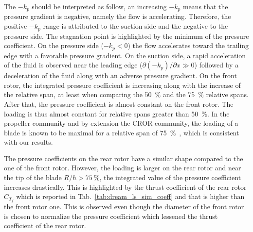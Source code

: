 The $- k_p$ should be interpreted as follow, an increasing $- k_p$
means that the pressure gradient is negative, namely the flow
is accelerating. Therefore, the positive  $-k_p$ range is attributed
to the suction side and the negative to the pressure side.
The stagnation point is highlighted
by the minimum of the pressure coefficient. On the pressure side 
($-k_p < 0$) the flow accelerates
toward the trailing edge with a favorable pressure gradient. 
On the suction side, a rapid acceleration of the fluid
is observed near the leading edge 
($\partial (-k_p) / \partial x \gg 0$) followed by
a deceleration of the fluid along with an
adverse pressure gradient.
On the front rotor, the integrated pressure coefficient is
increasing along with the increase of the relative span, at least 
when comparing the 50~\% and the 75~\% relative spans.
After that, the pressure coefficient is almost constant on 
the front rotor. The loading is thus almost constant for
relative spans greater than 50~\%. In the propeller community and
by extension the CROR community, the loading of a blade is known
to be maximal for a relative span of 75~\%~\cite{Bousquet2012},
which is consistent with our results.

The pressure coefficients on the rear rotor have a similar shape
compared to the one of the front rotor. However, the loading is
larger on the rear rotor and near the tip of the blade
$R/h > 75~\%$, the integrated value of the pressure coefficient
increases drastically. This is highlighted by the thrust coefficient 
of the rear rotor $C_{T_f}$ which is reported in 
Tab.~\ref{tab:dream_ls_sim_coeff} and that is higher than
the front rotor one. This is observed even though the diameter of the front
rotor is chosen to normalize the pressure coefficient which
lessened the thrust coefficient of the rear rotor.

